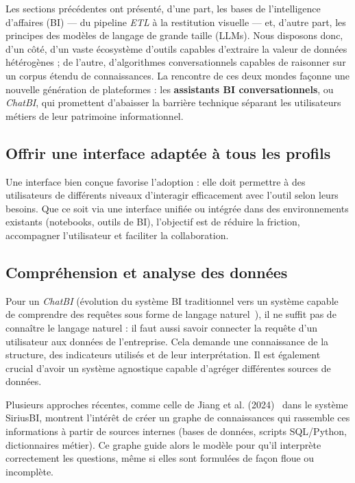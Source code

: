 \documentclass[conference]{IEEEtran}
\begin{document}
Les sections précédentes ont présenté, d’une part, les bases de l’intelligence d’affaires (BI) — du pipeline \textit{ETL} à la restitution visuelle — et, d’autre part, les principes des modèles de langage de grande taille (LLMs).  Nous disposons donc, d’un côté, d’un vaste écosystème d’outils capables d’extraire la valeur de données hétérogènes ; de l’autre, d’algorithmes conversationnels capables de raisonner sur un corpus étendu de connaissances.  La rencontre de ces deux mondes façonne une nouvelle génération de plateformes : les \textbf{assistants BI conversationnels}, ou \emph{ChatBI}, qui promettent d’abaisser la barrière technique séparant les utilisateurs métiers de leur patrimoine informationnel.

\subsection{Offrir une interface adaptée à tous les profils}
\label{sec:interface_profiles}

Une interface bien conçue favorise l’adoption : elle doit permettre à des utilisateurs de différents niveaux d’interagir efficacement avec l’outil selon leurs besoins. Que ce soit via une interface unifiée ou intégrée dans des environnements existants (notebooks, outils de BI), l’objectif est de réduire la friction, accompagner l’utilisateur et faciliter la collaboration.

\subsection{Compréhension et analyse des données}
\label{sec:comprehension_donnees}

Pour un \emph{ChatBI} (évolution du système BI traditionnel vers un système capable de comprendre des requêtes sous forme de langage naturel~\citep{jiang2024siriusbi}), il ne suffit pas de connaître le langage naturel : il faut aussi savoir connecter la requête d’un utilisateur aux données de l’entreprise. Cela demande une connaissance de la structure, des indicateurs utilisés et de leur interprétation. Il est également crucial d’avoir un système agnostique capable d’agréger différentes sources de données.

Plusieurs approches récentes, comme celle de Jiang et al. (2024)~\citep{jiang2024siriusbi} dans le système SiriusBI, montrent l’intérêt de créer un graphe de connaissances qui rassemble ces informations à partir de sources internes (bases de données, scripts SQL/Python, dictionnaires métier). Ce graphe guide alors le modèle pour qu’il interprète correctement les questions, même si elles sont formulées de façon floue ou incomplète.
\end{document}
